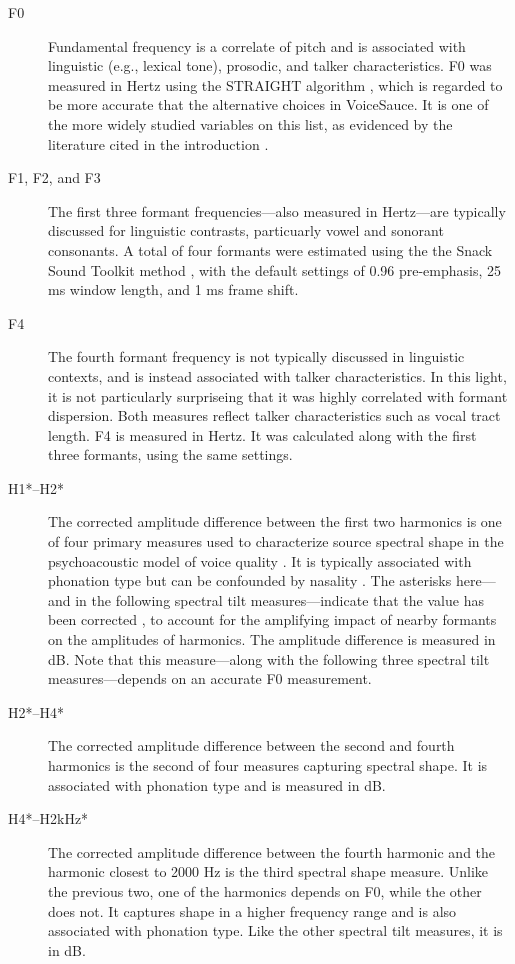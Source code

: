 \begin{description}
    \item[F0] Fundamental frequency is a correlate of pitch and is associated with linguistic (e.g., lexical tone), prosodic, and talker characteristics. F0 was measured in Hertz using the STRAIGHT algorithm \citep{kawahara_2016_straight}, which is regarded to be more accurate that the alternative choices in VoiceSauce. It is one of the more widely studied variables on this list, as evidenced by the literature cited in the introduction \citep[e.g.,][]{cheng_2020_f0,ng_2012_ltas}.
    \item[F1, F2, and F3] The first three formant frequencies---also measured in Hertz---are typically discussed for linguistic contrasts, particuarly vowel and sonorant consonants. A total of four formants were estimated using the the Snack Sound Toolkit method \cite{sjolander_2004_snack}, with the default settings of 0.96 pre-emphasis, 25 ms window length, and 1 ms frame shift.
    \item[F4] The fourth formant frequency is not typically discussed in linguistic contexts, and is instead associated with talker characteristics. In this light, it is not particularly surpriseing that it was highly correlated with formant dispersion. Both measures reflect talker characteristics such as vocal tract length. F4 is measured in Hertz. It was calculated along with the first three formants, using the same settings.
    \item[H1*--H2*] The corrected amplitude difference between the first two harmonics is one of four primary measures used to characterize source spectral shape in the psychoacoustic model of voice quality \citep{kreiman_2014_theory}. It is typically associated with phonation type but can be confounded by nasality \citep{garellek_2019_voice,munson_2019_phonetics}. The asterisks here---and in the following spectral tilt measures---indicate that the value has been corrected \citep{iseli_2007_voice}, to account for the amplifying impact of nearby formants on the amplitudes of harmonics. The amplitude difference is measured in dB. Note that this measure---along with the following three spectral tilt measures---depends on an accurate F0 measurement.
    \item[H2*--H4*] The corrected amplitude difference between the second and fourth harmonics is the second of four measures capturing spectral shape. It is associated with phonation type and is measured in dB.
    \item[H4*--H2kHz*] The corrected amplitude difference between the fourth harmonic and the harmonic closest to 2000 Hz is the third spectral shape measure. Unlike the previous two, one of the harmonics depends on F0, while the other does not. It captures shape in a higher frequency range and is also associated with phonation type. Like the other spectral tilt measures, it is in dB.

\end{description}

